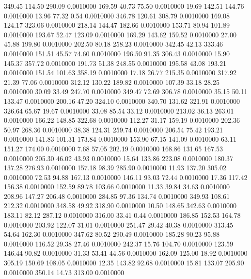  349.45  114.50  290.09   0.0010000
 169.59   40.73   75.50   0.0010000
  19.69  142.51  144.76   0.0010000
  13.96   77.32    0.54   0.0010000
 346.78  120.61  308.79   0.0010000
 169.08  124.17  323.06   0.0010000
 218.14  144.47  182.66   0.0010000
 153.71   80.94  101.89   0.0010000
 193.67   52.47  123.09   0.0010000
 169.29  143.62  159.52   0.0010000
  27.00   45.88  199.80   0.0010000
 202.50   80.18  258.23   0.0010000
 342.45   42.13  333.46   0.0010000
 151.51   45.57   74.60   0.0010000
 196.50   91.35  306.43   0.0010000
  15.90  145.37  357.72   0.0010000
 191.73   51.38  248.55   0.0010000
 195.58   43.08  193.21   0.0010000
 151.54  101.63  358.19   0.0010000
  17.18   26.77  215.35   0.0010000
 317.92   21.39   77.06   0.0010000
 312.12  130.22  189.82   0.0010000
 107.39   33.18   28.25   0.0010000
  30.09   33.49  247.70   0.0010000
 349.47   72.69  306.78   0.0010000
  35.15   50.11  133.47   0.0010000
 200.16   47.20  324.10   0.0010000
 340.70  131.62  321.91   0.0010000
 326.64   65.67   19.67   0.0010000
  33.08   85.54   33.12   0.0010000
 213.02   36.13  263.01   0.0010000
 166.22  148.85  322.68   0.0010000
 112.27   31.17  159.19   0.0010000
 202.36   50.97  268.36   0.0010000
  38.38  124.31  259.74   0.0010000
 206.54   75.42  193.21   0.0010000
 141.83  101.31  173.84   0.0010000
 153.90   67.15  141.09   0.0010000
  63.11  151.27  174.00   0.0010000
   7.68   57.05  202.19   0.0010000
 168.86  131.65  167.53   0.0010000
 205.30   46.02   43.93   0.0010000
  15.64  133.86  223.08   0.0010000
 180.37  137.28  276.93   0.0010000
 157.18   98.39  285.90   0.0010000
  11.93  137.20  305.02   0.0010000
  72.53   94.88  167.13   0.0010000
 146.11   93.03   72.44   0.0010000
  17.36  117.42  156.38   0.0010000
 152.59   89.78  103.66   0.0010000
  11.33   39.84   34.63   0.0010000
 208.96  147.27  206.48   0.0010000
 284.85   97.36  134.74   0.0010000
 349.93  108.61  212.32   0.0010000
 348.58   49.92  318.90   0.0010000
  10.50  148.65  342.63   0.0010000
 183.11   82.12  287.12   0.0010000
 316.00   33.41    0.44   0.0010000
 186.85  152.53  164.78   0.0010000
 203.92  122.07   31.01   0.0010000
 251.47   29.42   40.38   0.0010000
 313.45   54.64  162.30   0.0010000
 347.62   80.52  290.49   0.0010000
 185.28   90.23   95.88   0.0010000
 116.52   29.38   27.46   0.0010000
 242.37   15.76  104.70   0.0010000
 123.59  146.44   90.82   0.0010000
  31.33   53.41   44.56   0.0010000
 162.09  125.00   18.92   0.0010000
 305.19  150.69  108.05   0.0010000
  12.35  143.82   92.68   0.0010000
  15.81  133.07  205.90   0.0010000
 350.14   14.73  313.00   0.0010000
